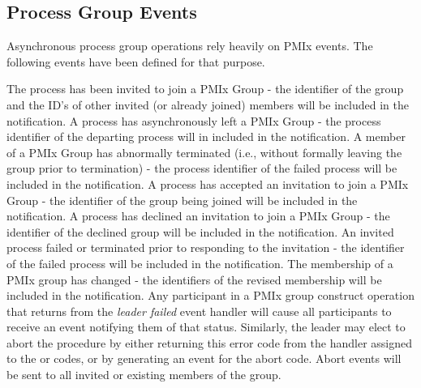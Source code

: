 \subsection{Process Group Events}

Asynchronous process group operations rely heavily on \ac{PMIx} events.  The following events have been defined for that purpose.

\begin{constantdesc}
%
The process has been invited to join a \ac{PMIx} Group - the identifier of the group and the ID's of other invited (or already joined) members will be included in the notification.
%
A process has asynchronously left a \ac{PMIx} Group - the process identifier of the departing process will in included in the notification.
%
A member of a \ac{PMIx} Group has abnormally terminated (i.e., without formally leaving the group prior to termination) - the process identifier of the failed process will be included in the notification.
%
A process has accepted an invitation to join a \ac{PMIx} Group - the identifier of the group being joined will be included in the notification.
%
A process has declined an invitation to join a \ac{PMIx} Group - the identifier of the declined group will be included in the notification.
%
An invited process failed or terminated prior to responding to the invitation - the identifier of the failed process will be included in the notification.
%
The membership of a \ac{PMIx} group has changed - the identifiers of the revised membership will be included in the notification.
%
Any participant in a \ac{PMIx} group construct operation that returns  from the \emph{leader failed} event handler will cause all participants to receive an event notifying them of that status. Similarly, the leader may elect to abort the procedure by either returning this error code from the handler assigned to the  or  codes, or by generating an event for the abort code. Abort events will be sent to all invited or existing members of the group.

\end{constantdesc}
